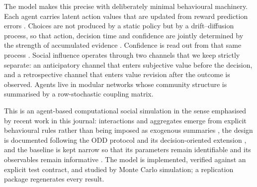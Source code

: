 \documentclass[11pt]{article}
\newcommand{\1}{\mathbf{1}}
\begin{document}
The model makes this precise with deliberately minimal behavioural machinery.
Each agent carries latent action values that are updated from reward prediction
errors \citep{SuttonBarto2018,DayanDaw2008}. Choices are not produced by a
static policy but by a drift--diffusion process, so that action, decision time
and confidence are jointly determined by the strength of accumulated evidence
\citep{Ratcliff1978,RatcliffSmithBrownMcKoon2016}. Confidence is read out from
that same process \citep{KianiShadlen2009,Drugowitsch2019}. Social influence
operates through two channels that we keep strictly separate: an anticipatory
channel that enters subjective value before the decision, and a retrospective
channel that enters value revision after the outcome is observed. Agents live in
modular networks whose community structure is summarised by a row-stochastic
coupling matrix.

This is an agent-based computational social simulation in the sense
emphasised by recent work in this journal: interactions and aggregates emerge
from explicit behavioural rules rather than being imposed as exogenous
summaries \citep{StoneKunasekaranPoulosMacIntyreHeslop2026}, the design is
documented following the ODD protocol and its decision-oriented extension
\citep{GrimmBergerDeAngelisPolhillGiskeRailsback2010,Grimm2020,MullerBohmeFrankGrabnitzMuller2013},
and the baseline is kept narrow so that its parameters remain identifiable and
its observables remain informative \citep{OlukanWardMallesonGe2026,Carrella2021,McCullochGeWardHeppenstallPolhillMalleson2022}.
The model is implemented, verified against an explicit test contract, and
studied by Monte Carlo simulation; a replication package regenerates every
result.
\end{document}
